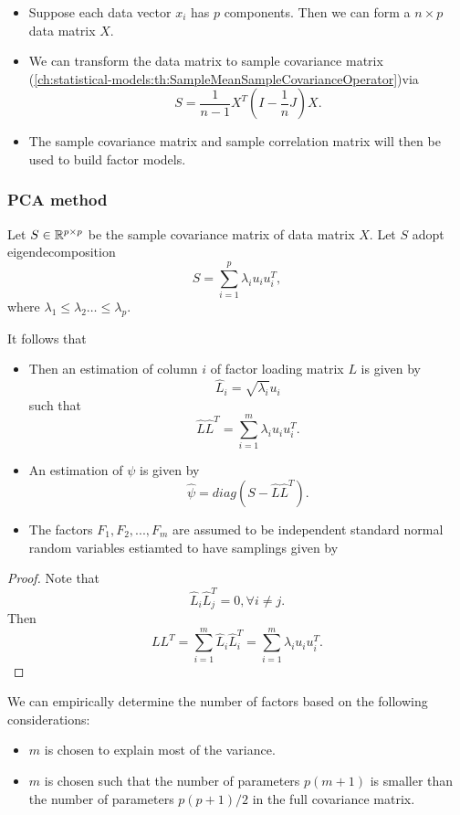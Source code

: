 \begin{refsection}
\begin{remark}\hfill
\begin{itemize}
	\item Suppose each data vector $x_i$ has $p$ components. Then we can form a $n\times p$ data matrix $X$.
	\item We can transform the data matrix to sample covariance matrix (\autoref{ch:statistical-models:th:SampleMeanSampleCovarianceOperator})via
	$$S = \frac{1}{n-1}X^T(I-\frac{1}{n}J)X.$$
	\item The sample covariance matrix and sample correlation matrix will then be used to build factor models.
\end{itemize}	
\end{remark}


\subsubsection{PCA method}
\begin{lemma}\cite[488]{johnson2007applied}
Let $S\in \mathbb{R}^{p\times p}$ be the sample covariance matrix of data matrix $X$. Let $S$ adopt eigendecomposition $$S = \sum_{i=1}^p \lambda_i u_i u_i^T, $$where $\lambda_1\leq \lambda_2 \dots \leq \lambda_p$. 

It follows that
\begin{itemize}
	\item Then an estimation of column $i$ of factor loading matrix $L$ is given by
	$$\hat{L}_i = \sqrt{\lambda_i}u_i$$
	such that
	$$\hat{L}\hat{L}^T = \sum_{i=1}^m \lambda_i u_i u_i^T.$$
	\item An estimation of $\psi$ is given by
	$$\hat{\psi} = diag(S - \hat{L}\hat{L}^T).$$
	\item The factors $F_1,F_2,...,F_m$ are assumed to be independent standard normal random variables estiamted to have samplings given by
	$$$$ 
\end{itemize}

\end{lemma}
\begin{proof}
Note that
$$\hat{L}_i\hat{L}_j^T = 0, \forall i\neq j.$$
Then
$$LL^T = \sum_{i=1}^{m} \hat{L}_i\hat{L}_i^T = \sum_{i=1}^{m} \lambda_i u_iu_i^T.$$
\end{proof}

\begin{remark}
We can empirically determine the number of factors based on the following considerations:
\begin{itemize}
	\item $m$ is chosen to explain most of the variance.
	\item $m$ is chosen such that the number of parameters $p(m+1)$ is smaller than the number of parameters $p(p+1)/2$ in the full covariance matrix.
\end{itemize}	
	

\end{remark}
\end{refsection}

